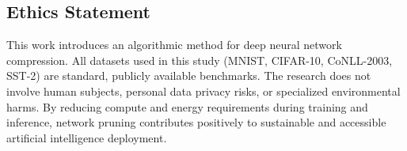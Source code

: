 \subsection*{Ethics Statement}

This work introduces an algorithmic method for deep neural network compression. All datasets used in this study (MNIST, CIFAR-10, CoNLL-2003, SST-2) are standard, publicly available benchmarks. The research does not involve human subjects, personal data privacy risks, or specialized environmental harms. By reducing compute and energy requirements during training and inference, network pruning contributes positively to sustainable and accessible artificial intelligence deployment.
